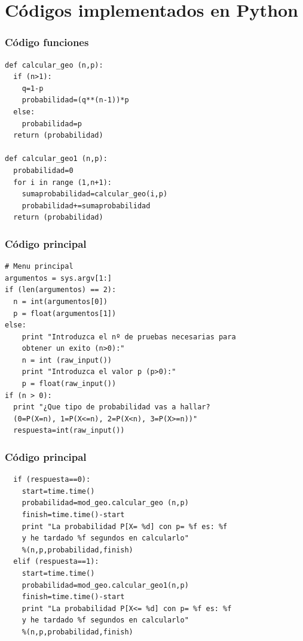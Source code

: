 \documentclass{beamer}
\begin{document}
\section {Códigos implementados en Python}
\begin{frame}[fragile]
\frametitle{Código funciones}
\scriptsize   %
\begin{verbatim}
def calcular_geo (n,p):
  if (n>1):
    q=1-p
    probabilidad=(q**(n-1))*p
  else:
    probabilidad=p
  return (probabilidad)

def calcular_geo1 (n,p):
  probabilidad=0
  for i in range (1,n+1):
    sumaprobabilidad=calcular_geo(i,p)
    probabilidad+=sumaprobabilidad
  return (probabilidad)
\end{verbatim}
\hyperlink{Liga2}{}
\hypertarget<2>{Liga1}{}
\end{frame}
\begin{frame}[fragile]
\frametitle{Código principal}
\scriptsize   %
\begin{verbatim}
# Menu principal
argumentos = sys.argv[1:]
if (len(argumentos) == 2):
  n = int(argumentos[0])
  p = float(argumentos[1])
else:
    print "Introduzca el nº de pruebas necesarias para
    obtener un exito (n>0):"
    n = int (raw_input())
    print "Introduzca el valor p (p>0):"
    p = float(raw_input())
if (n > 0):
  print "¿Que tipo de probabilidad vas a hallar?
  (0=P(X=n), 1=P(X<=n), 2=P(X<n), 3=P(X>=n))"
  respuesta=int(raw_input())
\end{verbatim}
\hypertarget<2>{Liga3}{}
\end{frame}
\begin{frame}[fragile]
\frametitle{Código principal}
\scriptsize   %
\begin{verbatim}
  if (respuesta==0):
    start=time.time()
    probabilidad=mod_geo.calcular_geo (n,p)
    finish=time.time()-start
    print "La probabilidad P[X= %d] con p= %f es: %f
    y he tardado %f segundos en calcularlo"
    %(n,p,probabilidad,finish)
  elif (respuesta==1):
    start=time.time()
    probabilidad=mod_geo.calcular_geo1(n,p)
    finish=time.time()-start
    print "La probabilidad P[X<= %d] con p= %f es: %f
    y he tardado %f segundos en calcularlo"
    %(n,p,probabilidad,finish)
\end{verbatim}
\end{frame}
\end{document}
